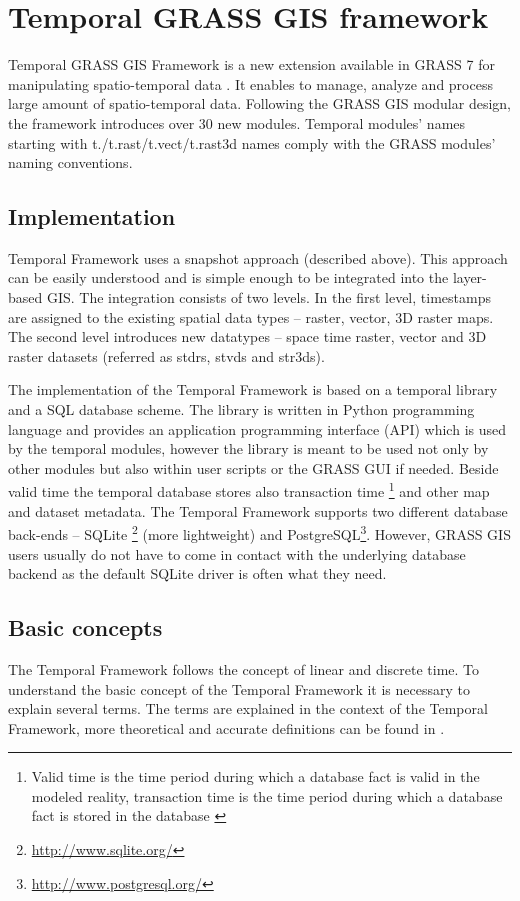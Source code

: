 \documentclass[a4paper,12pt,oneside]{book}
\newcommand{\tf}{Temporal Framework\xspace}
\begin{document}

\section{Temporal GRASS GIS framework}
\label{sec:GRASSTF}
Temporal GRASS GIS Framework is a new extension available in GRASS 7
for manipulating spatio-temporal data \cite{soerenTGRASS}.
It enables to manage, analyze and process large amount of spatio-temporal data.
Following the GRASS GIS modular design, the framework introduces over 30 new modules.
Temporal modules' names starting with t./t.rast/t.vect/t.rast3d names
comply with the GRASS modules' naming conventions.

\subsection{Implementation}
\tf uses a snapshot approach (described above).
This approach can be easily understood and is simple enough to be integrated into the layer-based GIS.
The integration consists of two levels.
In the first level, timestamps are assigned to the existing spatial data types -- raster, vector, 3D raster maps.
The second level introduces new datatypes -- space time raster,
vector and 3D raster datasets (referred as stdrs, stvds and str3ds).

The implementation of the \tf is based on a temporal library and a SQL database scheme.
The library is written in Python programming language and provides an application programming interface (API) which is used by the temporal modules,
however the library is meant to be used not only by other modules but also within user scripts or the GRASS GUI if needed.
Beside valid time the temporal database stores also transaction time%
\footnote{Valid time is the time period during which a database fact is valid in the modeled reality,
transaction time  is the time period during which a database fact is stored in the database \cite{temporalGlossary}}
and other map and dataset metadata.
The \tf supports two different database back-ends -- SQLite%
\footnote{\url{http://www.sqlite.org/}} (more lightweight) and
PostgreSQL\footnote{\url{http://www.postgresql.org/}}.
However, GRASS GIS users usually do not have to come in contact with the underlying database backend
as the default SQLite driver is often what they need.

\subsection{Basic concepts}
The \tf follows the concept of linear and discrete time.
To understand the basic concept of the \tf it is necessary to explain several terms.
The terms are explained in the context of the \tf , more theoretical and accurate definitions can be found in \cite{temporalGlossary}.
\end{document}
